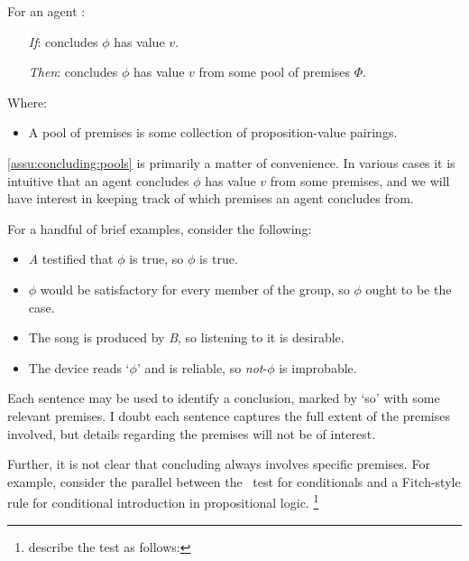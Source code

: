 \begin{note}

  \begin{assumption}
    \label{assu:concluding:pools}
    For an agent \vAgent{}:

    \begin{enumerate}
    \item[\emph{If}:]
      \vAgent{} concludes \(\phi\) has value \(v\).
    \item[\emph{Then}:]
      \vAgent{} concludes \(\phi\) has value \(v\) from some pool of premises \(\Phi\).
    \end{enumerate}
    Where:
    \begin{itemize}
    \item
      A pool of premises is some collection of proposition-value pairings.
    \end{itemize}
    \vspace{-\baselineskip}
  \end{assumption}

  \autoref{assu:concluding:pools} is primarily a matter of convenience.
  In various cases it is intuitive that an agent concludes \(\phi\) has value \(v\) from some premises, and we will have interest in keeping track of which premises an agent concludes from.

  For a handful of brief examples, consider the following:

  \begin{itemize}[noitemsep]
  \item
    \emph{A} testified that \(\phi\) is true, so \(\phi\) is true.
  \item
    \(\phi\) would be satisfactory for every member of the group, so \(\phi\) ought to be the case.
  \item
    The song is produced by \emph{B}, so listening to it is desirable.
  \item
    The device reads `\(\phi\)' and is reliable, so \emph{not}-\(\phi\) is improbable.
  \end{itemize}

  Each sentence may be used to identify a conclusion, marked by `so' with some relevant premises.
  I doubt each sentence captures the full extent of the premises involved, but details regarding the premises will not be of interest.

  Further, it is not clear that concluding always involves specific premises.
  For example, consider the parallel between the~\citeauthor{Ramsey:1929tf} test for conditionals and a Fitch-style rule for conditional introduction in propositional logic.%
  \footnote{
    \textcite{Read:1995wf} describe the test as follows:

}
\end{note}
